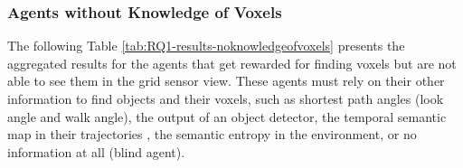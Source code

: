 
\newpage
\subsubsection{Agents without Knowledge of Voxels}
The following Table \ref{tab:RQ1-results-noknowledgeofvoxels} presents the aggregated results for the agents that get rewarded for finding voxels but are not able to see them in the grid sensor view. These agents must rely on their other information to find objects and their voxels, such as shortest path angles (look angle and walk angle), the output of an object detector, the temporal semantic map in their trajectories \cite{chaplot2020semantic}, the semantic entropy in the environment, or no information at all (blind agent).

